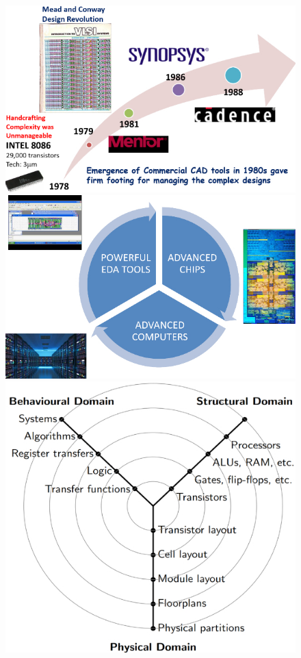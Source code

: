 \begin{figure}[H]
\centering
\includegraphics[scale=1.3]{src/Figures/chap1/chap1-fig04a.jpg}\qquad\qquad
\includegraphics[scale=1.3]{src/Figures/chap1/chap1-fig04b.jpg}\\[35pt]
\includegraphics[scale=1.3]{src/Figures/chap1/chap1-fig04c.jpg}\qquad\qquad

\end{figure}

